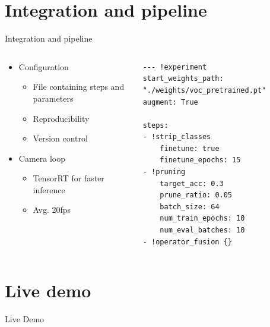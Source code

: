 \documentclass[en]{sdqbeamer}
\begin{document}
\section{Integration and pipeline}
\begin{frame}[fragile]{Integration and pipeline}
  \begin{columns}
    \begin{column}{0.5\textwidth}
      \begin{itemize}
      \item Configuration
        \begin{itemize}
        \item File containing steps and parameters
        \item Reproducibility
        \item Version control
        \end{itemize}
      \item Camera loop
        \begin{itemize}
        \item TensorRT for faster inference
        \item Avg. 20fps
        \end{itemize}
      \end{itemize}
    \end{column}

    \begin{column}{0.5\textwidth}
      \begin{lstlisting}
--- !experiment
start_weights_path: "./weights/voc_pretrained.pt"
augment: True

steps:
- !strip_classes
    finetune: true
    finetune_epochs: 15
- !pruning
    target_acc: 0.3
    prune_ratio: 0.05
    batch_size: 64
    num_train_epochs: 10
    num_eval_batches: 10
- !operator_fusion {}
      \end{lstlisting}
    \end{column}
  \end{columns}
\end{frame}

\section{Live demo}
\begin{frame}
  \begin{center}
    \huge{Live Demo}
  \end{center}
\end{frame}
\end{document}
